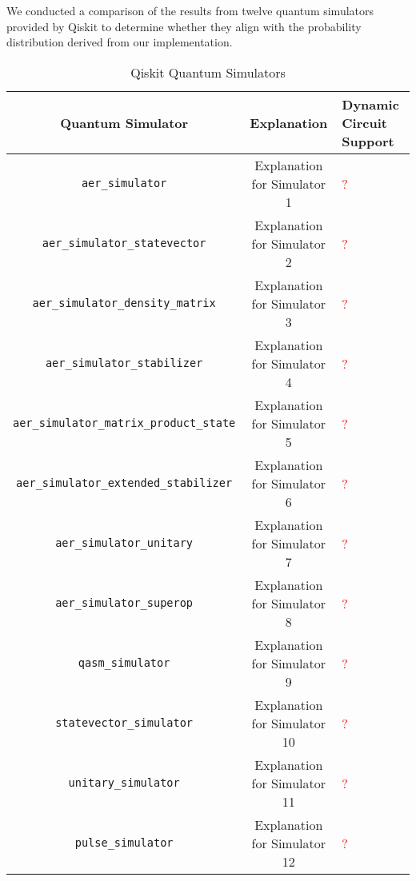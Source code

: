 \documentclass[10pt,a4paper]{article}
\newcommand{\<}{\langle}
\renewcommand{\>}{\rangle}
\begin{document}

We conducted a comparison of the results from twelve quantum simulators provided by Qiskit to
determine whether they align with the probability distribution derived from our implementation.

\begin{table}[h]
\centering
\begin{tabularx}{\textwidth}{|c|c|X|}
\hline
\textbf{Quantum Simulator} & \textbf{Explanation} & \textbf{Dynamic Circuit Support}\\
\hline
\texttt{aer\_simulator} & Explanation for Simulator 1 & \textcolor{red}{?} \\
\hline
\texttt{aer\_simulator\_statevector} & Explanation for Simulator 2 & \textcolor{red}{?} \\
\hline
\texttt{aer\_simulator\_density\_matrix} & Explanation for Simulator 3 & \textcolor{red}{?} \\
\hline
\texttt{aer\_simulator\_stabilizer} & Explanation for Simulator 4 & \textcolor{red}{?} \\
\hline
\texttt{aer\_simulator\_matrix\_product\_state} & Explanation for Simulator 5 & \textcolor{red}{?} \\
\hline
\texttt{aer\_simulator\_extended\_stabilizer}& Explanation for Simulator 6 & \textcolor{red}{?} \\
\hline
\texttt{aer\_simulator\_unitary} & Explanation for Simulator 7 & \textcolor{red}{?} \\
\hline
\texttt{aer\_simulator\_superop} & Explanation for Simulator 8 & \textcolor{red}{?} \\
\hline
\texttt{qasm\_simulator} & Explanation for Simulator 9 & \textcolor{red}{?} \\
\hline
\texttt{statevector\_simulator} & Explanation for Simulator 10 & \textcolor{red}{?} \\
\hline
\texttt{unitary\_simulator} & Explanation for Simulator 11 & \textcolor{red}{?} \\
\hline
\texttt{pulse\_simulator} & Explanation for Simulator 12 & \textcolor{red}{?} \\
\hline
\end{tabularx}
\caption{Qiskit Quantum Simulators}
\label{table:qsimulators}
\end{table}
\end{document}
